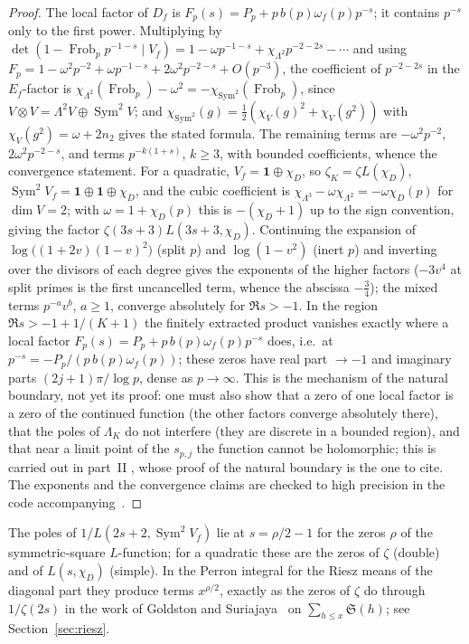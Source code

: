 \documentclass[11pt,a4paper]{article}
\theoremstyle{remark}\newtheorem{remark}[theorem]{Remark}
\newcommand{\Sig}{\mathfrak S}
\begin{document}
\begin{proof}
The local factor of $D_f$ is $F_p(s)=P_p+p\,b(p)\omega_f(p)p^{-s}$; it contains $p^{-s}$ only to the first
power. Multiplying by $\det(1-\operatorname{Frob}_pp^{-1-s}\mid V_f)=1-\omega p^{-1-s}+\chi_{\Lambda^2}p^{-2-2s}-\cdots$
and using $F_p=1-\omega^2p^{-2}+\omega p^{-1-s}+2\omega^2p^{-2-s}+O(p^{-3})$, the coefficient of $p^{-2-2s}$ in
the $E_f$-factor is $\chi_{\Lambda^2}(\operatorname{Frob}_p)-\omega^2=-\chi_{\operatorname{Sym}^2}(\operatorname{Frob}_p)$, since
$V\otimes V=\Lambda^2V\oplus\operatorname{Sym}^2V$; and $\chi_{\operatorname{Sym}^2}(g)=\tfrac12(\chi_V(g)^2+\chi_V(g^2))$ with
$\chi_V(g^2)=\omega+2n_2$ gives the stated formula. The remaining terms are $-\omega^2p^{-2}$, $2\omega^2p^{-2-s}$,
and terms $p^{-k(1+s)}$, $k\ge3$, with bounded coefficients, whence the convergence statement. For a
quadratic, $V_f=\mathbf 1\oplus\chi_D$, so $\zeta_K=\zeta L(\chi_D)$, $\operatorname{Sym}^2V_f=\mathbf 1\oplus\mathbf 1\oplus\chi_D$,
and the cubic coefficient is $\chi_{\Lambda^3}-\omega\chi_{\Lambda^2}=-\omega\chi_D(p)$ for $\dim V=2$; with
$\omega=1+\chi_D(p)$ this is $-(\chi_D+1)$ up to the sign convention, giving the factor $\zeta(3s+3)L(3s+3,\chi_D)$.
Continuing the expansion of $\log\bigl((1+2v)(1-v)^2\bigr)$ (split $p$) and $\log(1-v^2)$ (inert $p$) and
inverting over the divisors of each degree gives the exponents of the higher factors ($-3v^4$ at split
primes is the first uncancelled term, whence the abscissa $-\tfrac34$); the mixed terms $p^{-a}v^b$,
$a\ge1$, converge absolutely for $\Re s>-1$. In the region $\Re s>-1+1/(K+1)$ the finitely extracted
product vanishes exactly where a local factor $F_p(s)=P_p+p\,b(p)\omega_f(p)p^{-s}$ does, i.e.\ at
$p^{-s}=-P_p/(p\,b(p)\omega_f(p))$; these zeros have real part $\to-1$ and imaginary parts
$(2j+1)\pi/\log p$, dense as $p\to\infty$. This is the mechanism of the natural boundary, not yet its proof: one
must also show that a zero of one local factor is a zero of the continued function (the other factors converge
absolutely there), that the poles of $\Lambda_K$ do not interfere (they are discrete in a bounded region), and that
near a limit point of the $s_{p,j}$ the function cannot be holomorphic; this is carried out in part~II
\cite{ReichardtII}, whose proof of the natural boundary is the one to cite. The exponents and the
convergence claims are checked to high precision in the code accompanying~\cite{ReichardtII}.
\end{proof}

The poles of $1/L(2s+2,\operatorname{Sym}^2V_f)$ lie at $s=\rho/2-1$ for the zeros $\rho$ of the symmetric-square
$L$-function; for a quadratic these are the zeros of $\zeta$ (double) and of $L(s,\chi_D)$ (simple). In the
Perron integral for the Riesz means of the diagonal part they produce terms $x^{\rho/2}$, exactly as the
zeros of $\zeta$ do through $1/\zeta(2s)$ in the work of Goldston and
Suriajaya~\cite{GoldstonSuriajaya2021} on $\sum_{h\le x}\Sig(h)$; see Section~\ref{sec:riesz}.
\end{document}
